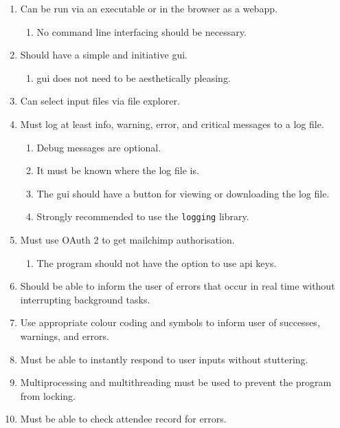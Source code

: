 \documentclass[11pt]{article}
\begin{document}
\begin{enumerate}
    \item Can be run via an executable or in the \gls{browser} as a \gls{webapp}.
    \begin{enumerate}
        \item No command line interfacing should be necessary.
    \end{enumerate}
    \item Should have a simple and initiative \acrshort{gui}.
    \begin{enumerate}
        \item \acrshort{gui} does not need to be aesthetically pleasing.
    \end{enumerate}
    \item Can select input files via file explorer.
    \item Must \gls{log} at least info, warning, error, and critical messages to a \gls{log} file.
    \begin{enumerate}
        \item Debug messages are optional.
        \item It must be known where the \gls{log} file is.
        \item The \acrshort{gui} should have a button for viewing or downloading the \gls{log} file.
        \item Strongly recommended to use the \texttt{logging} \gls{library}.
    \end{enumerate}
    \item Must use OAuth 2 to get \Gls{mailchimp} \gls{authorisation}.
    \begin{enumerate}
        \item The program should not have the option to use \acrshort{api} keys.
    \end{enumerate}
    \item Should be able to inform the \gls{user} of errors that occur in real time without interrupting background tasks.
    \item Use appropriate colour coding and symbols to inform \gls{user} of successes, warnings, and errors.
    \item Must be able to instantly respond to \gls{user} inputs without stuttering.
    \item Multiprocessing and multithreading must be used to prevent the program from locking.
    \item Must be able to check attendee record for errors.
    \begin{enumerate}

\end{enumerate}
\end{enumerate}
\end{document}
